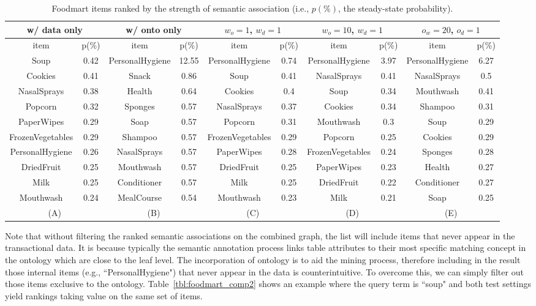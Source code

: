 \begin{table}[tbh]\scriptsize
\begin{center}
\begin{tabular}{ c c || c c || c c || c c || c c }
\hline
\multicolumn{2}{c||}{w/ data only}&\multicolumn{2}{c||}{w/ onto only}&\multicolumn{2}{c||}{$w_o=1$, $w_d=1$}&\multicolumn{2}{c||}{$w_o=10$, $w_d=1$}&\multicolumn{2}{c}{$o_w=20$, $o_d=1$}\\
\hline
item	&	p(\%)	&	item	&	p(\%)	&	item	&	p(\%)	&	item	&	p(\%)	&	item	&	p(\%)	\\
\hline																			
Soup	&	0.42	&	PersonalHygiene	&	12.55	&	PersonalHygiene	&	0.74	&	PersonalHygiene	&	3.97	&	 PersonalHygiene	&	 6.27	\\
Cookies	&	0.41	&	Snack	&	0.86	&	Soup	&	0.41	&	NasalSprays	&	0.41	&	NasalSprays	&	0.5	\\
NasalSprays	&	0.38	&	Health	&	0.64	&	Cookies	&	0.4	&	Soup	&	0.34	&	Mouthwash	&	0.41	\\
Popcorn	&	0.32	&	Sponges	&	0.57	&	NasalSprays	&	0.37	&	Cookies	&	0.34	&	Shampoo	&	0.31	\\
PaperWipes	&	0.29	&	Soap	&	0.57	&	Popcorn	&	0.31	&	Mouthwash	&	0.3	&	Soup	&	0.29	\\
FrozenVegetables	&	0.29	&	Shampoo	&	0.57	&	FrozenVegetables	&	0.29	&	Popcorn	&	0.25	&	Cookies	&	 0.29	 \\
PersonalHygiene	&	0.26	&	NasalSprays	&	0.57	&	PaperWipes	&	0.28	&	FrozenVegetables	&	0.24	&	Sponges	&	 0.28	 \\
DriedFruit	&	0.25	&	Mouthwash	&	0.57	&	DriedFruit	&	0.25	&	PaperWipes	&	0.23	&	Health	&	0.27	 \\
Milk	&	0.25	&	Conditioner	&	0.57	&	Milk	&	0.25	&	DriedFruit	&	0.22	&	Conditioner	&	0.27	\\
Mouthwash	&	0.24	&	MealCourse	&	0.54	&	Mouthwash	&	0.23	&	Milk	&	0.21	&	Soap	&	0.25	\\
\hline
\multicolumn{2}{c}{(A)}  &   \multicolumn{2}{c}{(B)}  &   \multicolumn{2}{c}{(C)}  &   \multicolumn{2}{c}{(D)}  &  \multicolumn{2}{c}{(E)}  \\
\end{tabular}
\end{center}
\caption{\label{tbl:foodmart_comp} Foodmart items ranked by the strength of semantic association (i.e., $p(\%)$, the steady-state probability).}
\end{table}

Note that without filtering the ranked semantic associations on the combined graph, the list will include items that never appear in the transactional data. It is because typically the semantic annotation process links table attributes to their most specific matching concept in the ontology which are close to the leaf level. The incorporation of ontology is to aid the mining process, therefore including in the result those internal items (e.g., ``PersonalHygiene") that never appear in the data is counterintuitive. To overcome this, we can simply filter out those items exclusive to the ontology. Table~\ref{tbl:foodmart_comp2} shows an example where the query term is ``soup" and both test settings yield rankings taking value on the same set of items.

